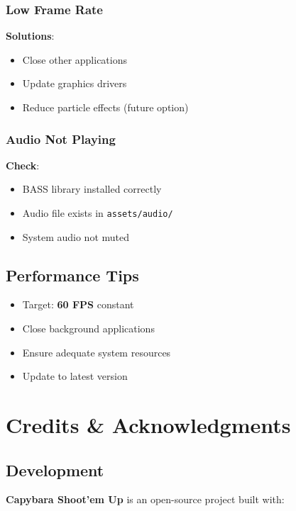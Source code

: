 \documentclass[11pt,a4paper]{article}
\begin{document}
\subsubsection{Low Frame Rate}

\textbf{Solutions}:
\begin{itemize}[nosep]
    \item Close other applications
    \item Update graphics drivers
    \item Reduce particle effects (future option)
\end{itemize}

\subsubsection{Audio Not Playing}

\textbf{Check}:
\begin{itemize}[nosep]
    \item BASS library installed correctly
    \item Audio file exists in \texttt{assets/audio/}
    \item System audio not muted
\end{itemize}

\subsection{Performance Tips}

\begin{itemize}[leftmargin=*]
    \item Target: \textbf{60 FPS} constant
    \item Close background applications
    \item Ensure adequate system resources
    \item Update to latest version
\end{itemize}

\section{Credits \& Acknowledgments}

\subsection{Development}

\textbf{Capybara Shoot'em Up} is an open-source project built with:
\end{document}
